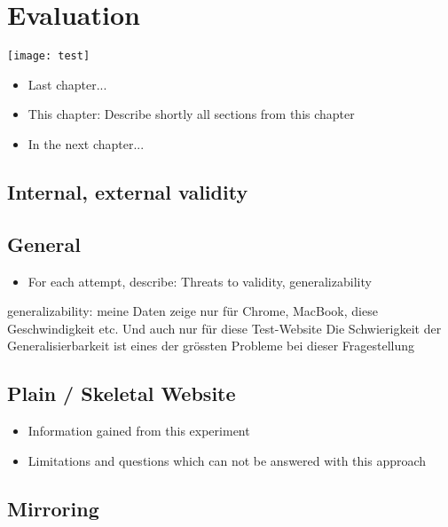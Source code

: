 \chapter{Evaluation}


\texttt{[image: test]}


\begin{itemize}
	\item Last chapter...
	\item This chapter: Describe shortly all sections from this chapter
	\item In the next chapter...
\end{itemize}




\section{Internal, external validity}





\section{General}

\begin{itemize}
    \item For each attempt, describe: Threats to validity, generalizability
\end{itemize}

generalizability: meine Daten zeige nur für Chrome, MacBook, diese Geschwindigkeit etc.
Und auch nur für diese Test-Website
Die Schwierigkeit der Generalisierbarkeit ist eines der grössten Probleme bei dieser Fragestellung

\section{Plain / Skeletal Website}

\begin{itemize}
\item Information gained from this experiment
\item Limitations and questions which can not be answered with this approach
\end{itemize}


\section{Mirroring}


